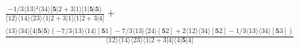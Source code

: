 \documentclass[varwidth, border=5pt]{standalone}
\begin{document}
\begin{my}
$\begin{gathered}
\scriptscriptstyle\frac{-1/3⟨13⟩²⟨34⟩[𝟓|2+3|1⟩[1|𝟓|𝟓⟩}{⟨12⟩⟨14⟩⟨23⟩⟨1|2+3|1]⟨1|2+3|4]} +\\
\scriptscriptstyle\frac{⟨13⟩⟨34⟩[4|𝟓|𝟓⟩(-7/3⟨13⟩⟨14⟩[𝟓1]-7/3⟨13⟩⟨24⟩[𝟓2]+2⟨12⟩⟨34⟩[𝟓2]-1/3⟨13⟩⟨34⟩[𝟓3])}{⟨12⟩⟨14⟩⟨23⟩⟨1|2+3|4]⟨4|𝟓|4]} \phantom{+}
\end{gathered}$
\end{my}
\end{document}
